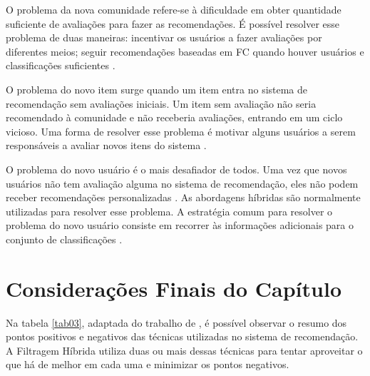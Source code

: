 O problema da nova comunidade refere-se à dificuldade em obter quantidade suficiente de avaliações para fazer as recomendações. É possível 
resolver esse problema de duas maneiras: incentivar os usuários a fazer avaliações por diferentes meios; seguir recomendações baseadas em FC 
quando houver usuários e classificações suficientes \cite{bobadilla2013}.

O problema do novo item surge quando um item entra no sistema de recomendação sem avaliações iniciais. 
Um item sem avaliação não seria recomendado à comunidade e não receberia avaliações, entrando em um ciclo vicioso. Uma forma 
de resolver esse problema é motivar alguns usuários a serem responsáveis a avaliar novos itens do sistema \cite{burke2002}. 

O problema do novo usuário é o mais desafiador de todos. Uma vez que novos usuários não tem 
avaliação alguma no sistema de recomendação, eles não podem receber recomendações personalizadas \cite{burke2002}. As abordagens híbridas são normalmente utilizadas para resolver esse problema. 
A estratégia comum para resolver o problema do novo usuário consiste em recorrer às informações adicionais para o conjunto de classificações \cite{bobadilla2013}.

\section{Considerações Finais do Capítulo}

Na tabela \ref{tab03}, adaptada do trabalho de , é possível observar o resumo dos pontos positivos e negativos das técnicas utilizadas no sistema de recomendação.
A Filtragem Híbrida utiliza duas ou mais dessas técnicas para tentar aproveitar o que há de melhor em cada uma e minimizar os pontos negativos.

